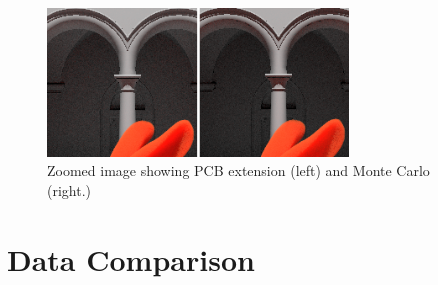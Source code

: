 \documentclass[runningheads]{llncs}
\begin{document}
\begin{figure}[h!]
    \centering
    \includegraphics[width=80mm]{img/compare1_corrected.png}
    \caption{Zoomed image showing PCB extension (left) and Monte Carlo (right.)}
    \label{fig:compare_close}
\end{figure}

\section{Data Comparison}

\setlength{\tabcolsep}{5pt}
\end{document}
